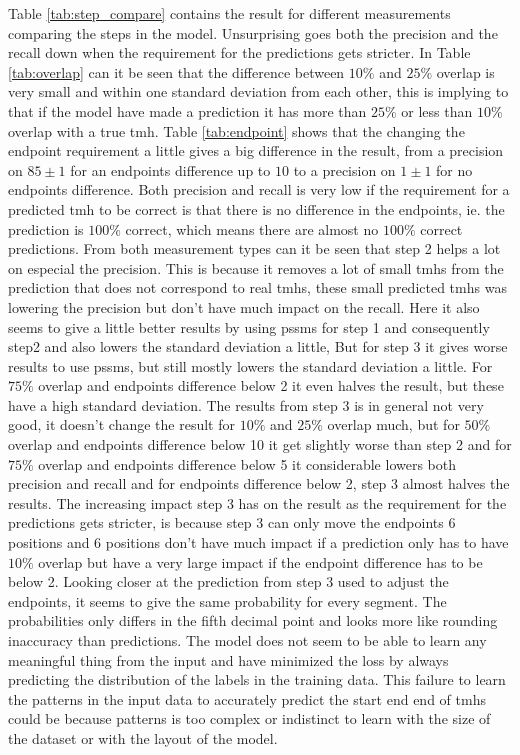 Table \ref{tab:step_compare} contains the result for different measurements 
comparing the steps in the model. Unsurprising goes both the precision and the 
recall down when the requirement for the predictions gets stricter. In 
Table \ref{tab:overlap} can it be seen that the difference between $10\%$ and $25\%$
overlap is very small and within one standard deviation from each other, 
this is implying to that if the model have made a prediction it has more than 
$25\%$ or less than $10\%$ overlap with a true \gls{tmh}.
Table \ref{tab:endpoint} shows that the changing the endpoint requirement a little 
gives a big difference in the result, from a precision on $85 \pm 1$ for an endpoints 
difference up to $10$ to a precision on $1 \pm 1$ for no endpoints difference.
Both precision and recall is very low if the requirement for a predicted \gls{tmh}
to be correct is that there is no difference in the endpoints, ie. the prediction 
is $100\%$ correct, which means there are almost no $100\%$ correct predictions.
From both measurement types can it be seen that step 2 helps a lot on especial 
the precision. This is because it removes a lot of small \glspl{tmh} from the 
prediction that does not correspond to real \glspl{tmh}, these small predicted 
\glspl{tmh} was lowering the precision but don't have much impact on the recall.
Here it also seems to give a little better results by using \glspl{pssm}
for step 1 and consequently step2 and also lowers the standard deviation a little,
But for step 3 it gives worse results to use \glspl{pssm}, but still mostly lowers 
the standard deviation a little. For $75\%$ overlap and endpoints difference below 
2 it even halves the result, but these have a high standard deviation.
The results from step 3 is in general not very good, it doesn't change the result for 
$10\%$ and $25\%$ overlap much, but for $50\%$ overlap and endpoints difference 
below 10 it get slightly worse than step 2 and for $75\%$ overlap and endpoints 
difference below 5 it considerable lowers both precision and recall
and for endpoints difference below 
2, step 3 almost halves the results. The increasing impact step 3 has on the 
result as the requirement for the predictions gets stricter, is because step 3 
can only move the endpoints 6 positions and 6 positions don't have much impact 
if a prediction only has to have $10\%$ overlap but have a very large impact 
if the endpoint difference has to be below 2. 
Looking closer at the prediction from step 3 used to adjust the endpoints, it 
seems to give the same probability for every segment. The probabilities only
differs in the fifth decimal point and looks more like rounding inaccuracy
than predictions. The model does not seem to be able to learn any meaningful
thing from the input and have minimized the loss by always predicting the 
distribution of the labels in the training data. 
This failure to learn the patterns in the input data to accurately predict
the start end end of \glspl{tmh} could be because patterns is too complex or 
indistinct to learn with the size of the dataset or with the layout of the 
model.

